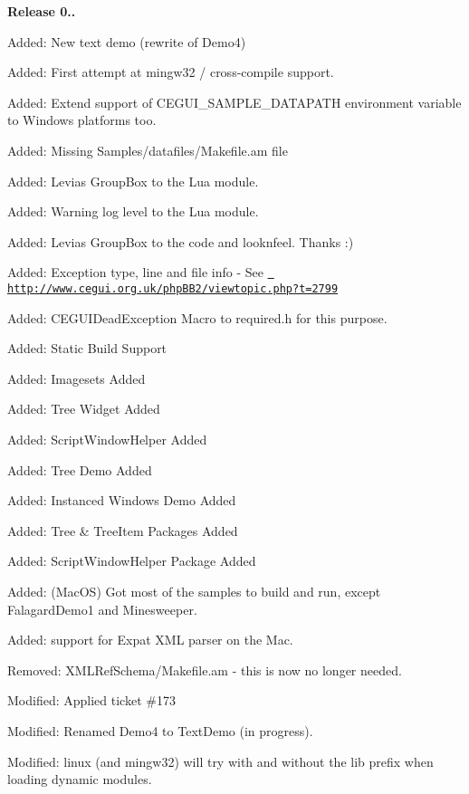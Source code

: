 {\bfseries{Release 0..}}
\begin{DoxyItemize}
\item Added\+: New text demo (rewrite of Demo4)
\item Added\+: First attempt at mingw32 / cross-\/compile support.
\item Added\+: Extend support of C\+E\+G\+U\+I\+\_\+\+S\+A\+M\+P\+L\+E\+\_\+\+D\+A\+T\+A\+P\+A\+TH environment variable to Windows platforms too.
\item Added\+: Missing Samples/datafiles/\+Makefile.\+am file
\item Added\+: Levia\textquotesingle{}s Group\+Box to the Lua module.
\item Added\+: Warning log level to the Lua module.
\item Added\+: Levia\textquotesingle{}s Group\+Box to the code and looknfeel. Thanks \+:)
\item Added\+: Exception type, line and file info -\/ See \href{http://www.cegui.org.uk/phpBB2/viewtopic.php?t=2799}{\texttt{ http\+://www.\+cegui.\+org.\+uk/php\+B\+B2/viewtopic.\+php?t=2799}}
\item Added\+: C\+E\+G\+U\+I\+Dead\+Exception Macro to required.\+h for this purpose.
\item Added\+: Static Build Support
\item Added\+: Imagesets Added
\item Added\+: Tree Widget Added
\item Added\+: Script\+Window\+Helper Added
\item Added\+: Tree Demo Added
\item Added\+: Instanced Windows Demo Added
\item Added\+: Tree \& Tree\+Item Packages Added
\item Added\+: Script\+Window\+Helper Package Added
\item Added\+: (Mac\+OS) Got most of the samples to build and run, except Falagard\+Demo1 and Minesweeper.
\item Added\+: support for Expat X\+ML parser on the Mac.
\item Removed\+: X\+M\+L\+Ref\+Schema/\+Makefile.\+am -\/ this is now no longer needed.
\item Modified\+: Applied ticket \#173
\item Modified\+: Renamed Demo4 to Text\+Demo (in progress).
\item Modified\+: linux (and mingw32) will try with and without the \textquotesingle{}lib\textquotesingle{} prefix when loading dynamic modules.

\end{DoxyItemize}
